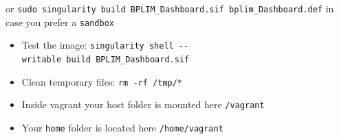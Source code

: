 \documentclass[
  12pt,
]{article}
\begin{document}
or
\texttt{sudo\ singularity\ build\ BPLIM\_Dashboard.sif\ bplim\_Dashboard.def}
in case you prefer a \texttt{sandbox}

\begin{itemize}
\item
  Test the image:
  \texttt{singularity\ shell\ -\/-writable\ build\ BPLIM\_Dashboard.sif}
\item
  Clean temporary files: \texttt{rm\ -rf\ /tmp/*}
\item
  Inside vagrant your host folder is mounted here \texttt{/vagrant}
\item
  Your \texttt{home} folder is located here \texttt{/home/vagrant}
\end{itemize}
\end{document}
